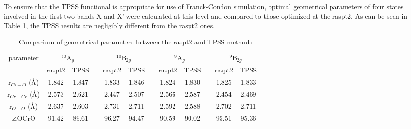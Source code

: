     
    To ensure that the TPSS functional is appropriate for use of Franck-Condon simulation, optimal geometrical parameters of four states involved in the first two bands X and X' were calculated at this level and compared to those optimized at the \acrshort{raspt2}. As can be seen in Table \ref{a6tbl:compare}, the TPSS results are negligibly different from the \acrshort{raspt2} ones. 
    
    
 \begin{landscape}   
    \begin{table}[htbp!]
        \centering
        \caption{Comparison of geometrical parameters between the \acrshort{raspt2} and TPSS methods}
        \label{a6tbl:compare}
        \begin{tabular}{@{}ccccccccccccc@{}}
            \toprule
            \multirow{2}{*}{parameter} & \multicolumn{2}{c}{$^{10}$A$_g$} &  & \multicolumn{2}{c}{$^{10}$B$_{2g}$} &  & \multicolumn{2}{c}{$^9$A$_g$} &  & \multicolumn{2}{c}{$^9$B$_{2g}$} \\ \cmidrule(lr){2-3} \cmidrule(lr){5-6} \cmidrule(lr){8-9} \cmidrule(l){11-12} 
    & \acrshort{raspt2} & TPSS   &  & \acrshort{raspt2} & TPSS   &  & \acrshort{raspt2} & TPSS   &  & \acrshort{raspt2} & TPSS       \\ \cmidrule(r){1-3} \cmidrule(lr){5-6} \cmidrule(lr){8-9} \cmidrule(l){11-12} 
     r$_{Cr-O}$ (\AA)              & 1.842  & 1.847  &  & 1.833  & 1.846  &  & 1.824  & 1.830  &  & 1.825  & 1.833      \\
     r$_{Cr-Cr}$ (\AA)             & 2.573  & 2.621  &  & 2.447  & 2.507  &  & 2.566  & 2.587  &  & 2.454  & 2.469      \\
     r$_{O-O}$ \hspace{1.2mm}(\AA) & 2.637  & 2.603  &  & 2.731  & 2.711  &  & 2.592  & 2.588  &  & 2.702  & 2.711      \\
     $\angle$OCrO                  & 91.42  & 89.61  &  & 96.27  & 94.47  &  & 90.59  & 90.02  &  & 95.51  & 95.36      \\ 		\bottomrule
        \end{tabular}
    \end{table}
\end{landscape}    

    

